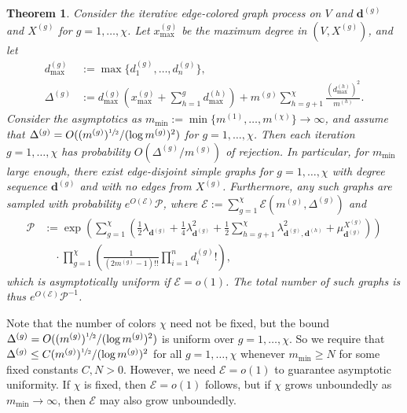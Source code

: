 \documentclass{article}
\theoremstyle{plain}
\newtheorem{theorem}{Theorem}[section]
\theoremstyle{remark}
\theoremstyle{plain}
\numberwithin{equation}{section}
\renewcommand{\d}{{\boldsymbol{d}}}
\begin{document}
	\begin{theorem}\label{theorem_colored}
		Consider the iterative edge-colored graph process on $V$ and $\d^{(g)}$ and $X^{(g)}$ for $g=1,\ldots,\chi$. Let $x_{\max}^{(g)}$ be the maximum degree in $(V,X^{(g)})$, and let
		\begin{align}
			d_{\max}^{(g)}&:=\max\{d_1^{(g)},\ldots,d_n^{(g)}\},
			\\\Delta^{(g)}&:=d_{\max}^{(g)}\left(x_{\max}^{(g)}+\sum_{h=1}^{g}d_{\max}^{(h)}\right)+m^{(g)}\sum_{h=g+1}^{\chi}\frac{(d_{\max}^{(h)})^2}{m^{(h)}}.
		\end{align}
		Consider the asymptotics as $m_{\min}:=\min\{m^{(1)},\ldots,m^{(\chi)}\}\to\infty$, and assume that $\Delta^{(g)}=O((m^{(g)})^{\sfrac12}/(\log m^{(g)})^2)$ for $g=1,\ldots,\chi$. Then each iteration $g=1,\ldots,\chi$ has probability $O(\Delta^{(g)}/m^{(g)})$ of rejection. In particular, for $m_{\min}$ large enough, there exist edge-disjoint simple graphs for $g=1,\ldots,\chi$ with degree sequence $\d^{(g)}$ and with no edges from $X^{(g)}$. Furthermore, any such graphs are sampled with probability $e^{O(\mathscr{E})}\mathscr{P}$, where $\mathscr{E}:=\sum_{g=1}^{\chi}\mathscr{E}(m^{(g)},\Delta^{(g)})$ and
		\begin{align}
			\mathscr{P}&:=\exp\left(\sum_{g=1}^{\chi}\left(\tfrac12\lambda_{\d^{(g)}}+\tfrac14\lambda_{\d^{(g)}}^2+\tfrac12\sum_{h=g+1}^{\chi}\lambda_{\d^{(g)},\d^{(h)}}^2+\mu_{\d^{(g)}}^{X^{(g)}}\right)\right)
			\\&\quad\cdot\prod_{g=1}^{\chi}\left(\frac1{(2m^{(g)}-1)!!}\prod_{i=1}^{n}d_i^{(g)}!\right),
		\end{align}
		which is asymptotically uniform if $\mathscr{E}=o(1)$. The total number of such graphs is thus $e^{O(\mathscr{E})}\mathscr{P}^{-1}$.
	\end{theorem}
	
	Note that the number of colors $\chi$ need not be fixed, but the bound $\Delta^{(g)}=O((m^{(g)})^{\sfrac12}/(\log m^{(g)})^2)$ is uniform over $g=1,\ldots,\chi$. So we require that $\Delta^{(g)}\leq C(m^{(g)})^{\sfrac12}/(\log m^{(g)})^2$ for all $g=1,\ldots,\chi$ whenever $m_{\min}\geq N$ for some fixed constants $C,N>0$. However, we need $\mathscr{E}=o(1)$ to guarantee asymptotic uniformity. If $\chi$ is fixed, then $\mathscr{E}=o(1)$ follows, but if $\chi$ grows unboundedly as $m_{\min}\to\infty$, then $\mathscr{E}$ may also grow unboundedly.
	
\end{document}
